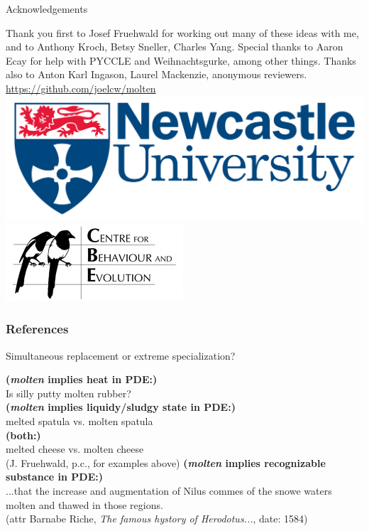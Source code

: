 \documentclass[hyperref={pdfpagelabels=false}]{beamer}
\begin{document}
\begin{frame}{Acknowledgements}
\begin{center}
Thank you first to Josef Fruehwald for working out many of these ideas with me, and to Anthony Kroch, Betsy Sneller, Charles Yang. Special thanks to Aaron Ecay for help with PYCCLE and Weihnachtsgurke, among other things. Thanks also to Anton Karl Ingason, Laurel Mackenzie, anonymous reviewers.
\vspace{5mm}\\
\url{https://github.com/joelcw/molten}\\\vspace{3mm}
\includegraphics[scale = 0.1]{ncllogo.jpg} \includegraphics[scale = 0.4]{CBElogo.jpg} 
\end{center}
\end{frame}


\begin{frame}[allowframebreaks]
\frametitle{References}
\newcommand*{\newblock}{natbib}


\end{frame}


\begin{frame}{Simultaneous replacement or extreme specialization?}
		\begin{exe}
			\ex \textbf{(\textsl{molten} implies heat in PDE:)}\\
			Is silly putty molten rubber?\\
			\ex \textbf{(\textsl{molten} implies liquidy/sludgy state in PDE:)}\\
			melted spatula vs. molten spatula\\
			\ex \textbf{(both:)}\\
			melted cheese vs. molten cheese\\
			(J. Fruehwald, p.c., for examples above)
			\ex \textbf{(\textsl{molten} implies recognizable substance in PDE:)}\\
			...that the increase and augmentation of Nilus commes of the snowe waters molten and thawed in those regions.\\
			(attr Barnabe Riche, \textsl{The famous hystory of Herodotus...}, date: 1584)
		\end{exe}
		
\end{frame}
\end{document}
